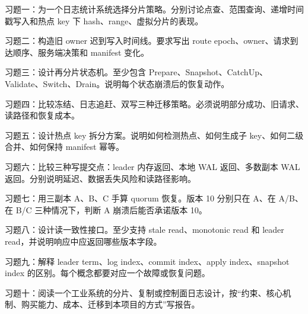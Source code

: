 \begin{exercisebox}
习题一：为一个日志统计系统选择分片策略。分别讨论点查、范围查询、递增时间戳写入和热点 key 下 hash、range、虚拟分片的表现。

习题二：构造旧 owner 迟到写入时间线。要求写出 route epoch、owner、请求到达顺序、服务端决策和 manifest 变化。

习题三：设计再分片状态机。至少包含 Prepare、Snapshot、CatchUp、Validate、Switch、Drain。说明每个状态崩溃后的恢复动作。

习题四：比较冻结、日志追赶、双写三种迁移策略。必须说明部分成功、旧请求、读路径和恢复成本。

习题五：设计热点 key 拆分方案。说明如何检测热点、如何生成子 key、如何二级合并、如何保持 manifest 幂等。

习题六：比较三种写提交点：leader 内存返回、本地 WAL 返回、多数副本 WAL 返回。分别说明延迟、数据丢失风险和读路径影响。

习题七：用三副本 A、B、C 手算 quorum 恢复。版本 10 分别只在 A、在 A/B、在 B/C 三种情况下，判断 A 崩溃后能否承诺版本 10。

习题八：设计读一致性接口。至少支持 stale read、monotonic read 和 leader read，并说明响应中应返回哪些版本字段。

习题九：解释 leader term、log index、commit index、apply index、snapshot index 的区别。每个概念都要对应一个故障或恢复问题。

习题十：阅读一个工业系统的分片、复制或控制面日志设计，按“约束、核心机制、购买能力、成本、迁移到本项目的方式”写报告。
\end{exercisebox}
